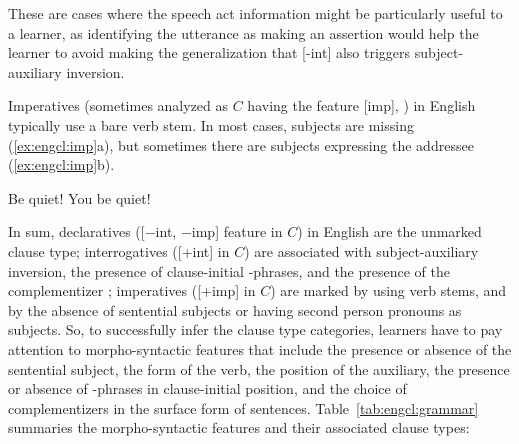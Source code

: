 These are cases where the speech act information might be particularly useful to a learner, as identifying the utterance as making an assertion would help the learner to avoid making the generalization that [-int] also triggers subject-auxiliary inversion. 

Imperatives (sometimes analyzed as $C$ having the feature [imp], \cite{platzack1997imp}) in English typically use a bare verb stem. In most cases, subjects are missing (\ref{ex:engcl:imp}a), but sometimes there are subjects expressing the addressee (\ref{ex:engcl:imp}b).

\bxl{}
Be quiet!
\ex You be quiet!
\exl
\eex


In sum, declaratives ([$-$int, $-$imp] feature in $C$) in English are the unmarked clause type; interrogatives ([+int] in $C$) are associated with subject-auxiliary inversion, the presence of clause-initial \twh-phrases, and the presence of the complementizer ; imperatives ([+imp] in $C$) are marked by using verb stems, and by the absence of sentential subjects or having second person pronouns as subjects. So, to successfully infer the clause type categories, learners have to pay attention to morpho-syntactic features that include the presence or absence of the sentential subject, the form of the verb, the position of the auxiliary, the presence or absence of \twh-phrases in clause-initial position, and the choice of complementizers in the surface form of sentences. Table~\ref{tab:engcl:grammar} summaries the morpho-syntactic features and their associated clause types:


